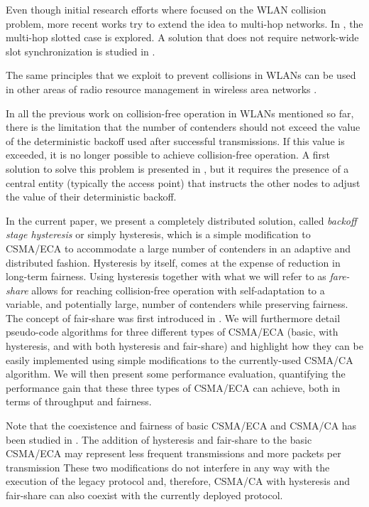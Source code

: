 \documentclass[conference]{IEEEtran}
\begin{document}
Even though initial research efforts where focused on the WLAN collision problem, more recent works try to extend the idea to multi-hop networks.
In \cite{hui2011epp}, the multi-hop slotted case is explored.
A solution that does not require network-wide slot synchronization is studied in  \cite{barcelo2013dcc}.

The same principles that we exploit to prevent collisions in WLANs can be used in other areas of radio resource management in wireless area networks \cite{duffy2011dcs,checco2012scs,checco2012lbc,khan2013aso}.

In all the previous work on collision-free operation in WLANs mentioned so far, there is the limitation that the number of contenders should not exceed the value of the deterministic backoff used after successful transmissions.
If this value is exceeded, it is no longer possible to achieve collision-free operation.
A first solution to solve this problem is presented in \cite{barcelo2011tcf}, but it requires the presence of a central entity (typically the access point) that instructs the other nodes to adjust the value of their deterministic backoff.

In the current paper, we present a completely distributed solution, called {\it backoff stage hysteresis} or simply hysteresis, which is a simple modification to CSMA/ECA to accommodate a large number of contenders in an adaptive and distributed fashion. Hysteresis by itself, comes at the expense of reduction in long-term fairness. Using hysteresis together with what we will refer to as {\it fare-share} allows for reaching collision-free operation with self-adaptation to a variable, and potentially large, number of contenders while preserving fairness. The concept of fair-share was first introduced in \cite{fang2011dlm}. We will furthermore detail pseudo-code algorithms for three different types of CSMA/ECA (basic, with hysteresis, and with both hysteresis and fair-share) and highlight how they can be easily implemented using simple modifications to the currently-used CSMA/CA algorithm. We will then present some performance evaluation, quantifying the performance gain that these three types of CSMA/ECA can achieve, both in terms of throughput and fairness. 

Note that the coexistence and fairness of basic CSMA/ECA and CSMA/CA has been studied in \cite{barcelo2010fcc}. 
The addition of hysteresis and fair-share to the basic CSMA/ECA may represent less frequent transmissions and more packets per transmission
These two modifications do not interfere in any way with the execution of the legacy protocol and, therefore, CSMA/CA with hysteresis and fair-share can also coexist with the currently deployed protocol.
\end{document}
